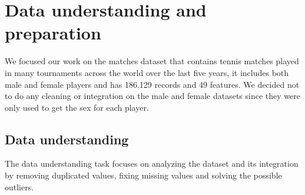 \section{Data understanding and preparation}
We focused our work on the matches dataset that contains tennis matches played in many tournaments across the world over the last five years, it includes both male and female players and has 186.129 records and 49 features. We decided not to do any cleaning or integration on the male and female datasets since they were only used to get the sex for each player.

\subsection{Data understanding}
The data understanding task focuses on analyzing the dataset and its integration by removing duplicated values, fixing missing values and solving the possible outliers.
